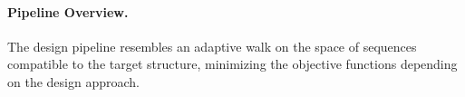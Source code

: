 \documentclass[../../master.tex]{subfiles}
\begin{document}






\paragraph{Pipeline Overview.}
\label{par:methods:pipelineoverview}

The design pipeline resembles an adaptive walk on the space of sequences compatible to the target structure, minimizing the objective functions depending on the design approach.
\end{document}
